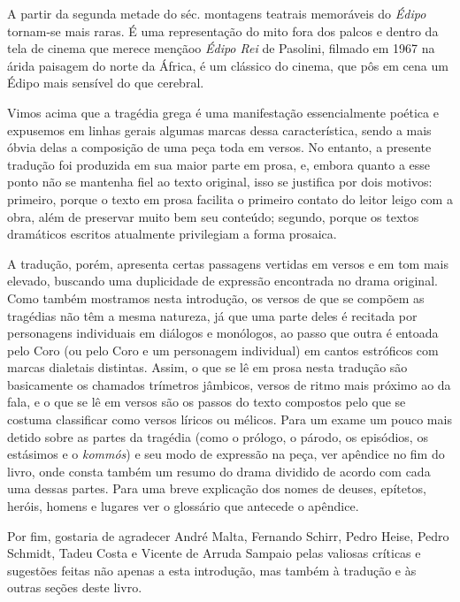 A partir da segunda metade do séc.  montagens teatrais memoráveis do
\emph{Édipo} tornam-se mais raras. É uma representação do mito fora dos
palcos e dentro da tela de cinema que merece menção\quad o \emph{Édipo Rei}
de Pasolini, filmado em 1967 na árida paisagem do norte da
África, é um clássico do cinema, que pôs em cena um Édipo mais sensível
do que cerebral.

\asterisc{}

Vimos acima que a tragédia grega é uma manifestação essencialmente
poética e expusemos em linhas gerais algumas marcas dessa
característica, sendo a mais óbvia delas a composição de uma peça toda
em versos. No entanto, a presente tradução foi produzida em sua maior
parte em prosa, e, embora quanto a esse ponto não se mantenha fiel ao
texto original, isso se justifica por dois motivos: primeiro, porque o
texto em prosa facilita o primeiro contato do leitor leigo com a obra,
além de preservar muito bem seu conteúdo; segundo, porque os textos
dramáticos escritos atualmente privilegiam a forma prosaica.

A tradução, porém, apresenta certas passagens vertidas em versos e em
tom mais elevado, buscando uma duplicidade de expressão encontrada no
drama original. Como também mostramos nesta introdução, os versos de que
se compõem as tragédias não têm a mesma natureza, já que uma parte deles
é recitada por personagens individuais em diálogos e monólogos, ao passo
que outra é entoada pelo Coro (ou pelo Coro e um personagem individual)
em cantos estróficos com marcas dialetais distintas. Assim, o que se lê
em prosa nesta tradução são basicamente os chamados trímetros jâmbicos,
versos de ritmo mais próximo ao da fala, e o que se lê em versos são os
passos do texto compostos pelo que se costuma classificar como versos
líricos ou mélicos. Para um exame um pouco mais detido sobre as partes
da tragédia (como o prólogo, o párodo, os episódios, os estásimos e o
\emph{kommós}) e seu modo de expressão na peça, ver apêndice no fim do
livro, onde consta também um resumo do drama dividido de acordo com cada
uma dessas partes. Para uma breve explicação dos nomes de deuses,
epítetos, heróis, homens e lugares ver o glossário que antecede o
apêndice.

\asterisc

Por fim, gostaria de agradecer André Malta, Fernando Schirr, Pedro
Heise, Pedro Schmidt, Tadeu Costa e Vicente de Arruda Sampaio pelas
valiosas críticas e sugestões feitas não apenas a esta introdução, mas
também à tradução e às outras seções deste livro.
